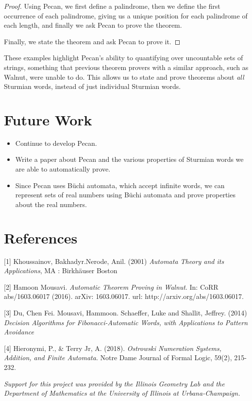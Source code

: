 \documentclass[landscape,usenames,dvipsnames]{sciposter}
\begin{document}
\begin{multicols}{3}
\begin{proof}
Using Pecan, we first define a palindrome, then we define the first occurrence of each palindrome, giving us a unique position for each palindrome of each length, and finally we ask Pecan to prove the theorem.

Finally, we state the theorem and ask Pecan to prove it.
\end{proof}

These examples highlight Pecan's ability to quantifying over uncountable sets of strings, something that previous theorem provers with a similar approach, such as Walnut, were unable to do.
This allows us to state and prove theorems about \emph{all} Sturmian words, instead of just individual Sturmian words.

\section*{Future Work}
\begin{itemize}
\item Continue to develop Pecan.
\item Write a paper about Pecan and the various properties of Sturmian words we are able to automatically prove.
\item Since Pecan uses B\"uchi automata, which accept infinite words, we can represent sets of real numbers using B\"uchi automata and prove properties about the real numbers.
\end{itemize}

\section*{References}

{\footnotesize [1] Khoussainov, Bakhadyr.Nerode, Anil. (2001) \emph{Automata Theory and its Applications}, MA : Birkh\"auser Boston
}

{\footnotesize [2] Hamoon Mousavi. \emph{Automatic Theorem Proving in Walnut}. In: CoRR abs/1603.06017 (2016).
arXiv: 1603.06017. url: http://arxiv.org/abs/1603.06017.
}

{\footnotesize [3] Du, Chen Fei. Mousavi, Hammoon. Schaeffer, Luke and Shallit, Jeffrey. (2014) \emph{Decision Algorithms for Fibonacci-Automatic Words, with Applications to Pattern Avoidance}
}

{\footnotesize [4] Hieronymi, P., \& Terry Jr, A. (2018). \emph{Ostrowski Numeration Systems, Addition, and Finite Automata}. Notre Dame Journal of Formal Logic, 59(2), 215-232.
}

\vspace*{10mm} %
\emph{
Support for this project was provided by the Illinois Geometry Lab and the Department of Mathematics at the University of Illinois at Urbana-Champaign.
}
\end{multicols}
\end{document}
